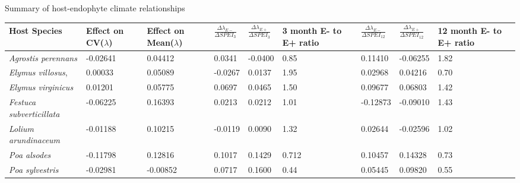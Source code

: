 \documentclass[12pt]{article}
\begin{document}
\newpage
{} Summary of host-endophyte climate relationships\\
\begin{table}[ht]
	\begin{adjustbox}{width=1\textwidth}{
			\begin{tabular}{|p{4cm}| p{2cm} |p{2cm}|p{2cm}|p{2cm}| p{2cm}|p{2cm}|p{2cm}|p{2cm}|}
				\hline
				\bf{Host Species} & \bf{Effect on CV($\lambda$)}& \bf{Effect on Mean($\lambda$)}&$\frac{\Delta\lambda_{E-}}{\Delta SPEI_{3}}$ & $\frac{\Delta\lambda_{E+}}{\Delta SPEI_{3}}$ &\bf{3 month E- to E+ ratio}&$\frac{\Delta\lambda_{E-}}{\Delta SPEI_{12}}$ &$\frac{\Delta\lambda_{E+}}{\Delta SPEI_{12}}$ &\bf{12 month E- to E+ ratio}\\
				\hline
				\emph{Agrostis perennans} &-0.02641&0.04412&0.0341&-0.0400&0.85&0.11410&-0.06255&1.82\\
				\emph{Elymus villosus}, &0.00033&0.05089&-0.0267&0.0137&1.95&0.02968&0.04216&0.70\\
				\emph{Elymus virginicus} &0.01201&0.05775&0.0697&0.0465&1.50&0.09677&0.06803&1.42\\
				\emph{Festuca subverticillata} &-0.06225&0.16393&0.0213&0.0212&1.01&-0.12873&-0.09010&1.43\\
				\emph{Lolium arundinaceum} &-0.01188&0.10215&-0.0119&0.0090&1.32&0.02644&-0.02596&1.02\\
				\emph{Poa alsodes} &-0.11798&0.12816&0.1017&0.1429&0.712&0.10457&0.14328&0.73\\
				\emph{Poa sylvestris}&-0.02981&-0.00852&0.0717&0.1600&0.44&0.05445&0.09820&0.55\\
				\hline
		\end{tabular}}
	\end{adjustbox}
\end{table}
\end{document}
